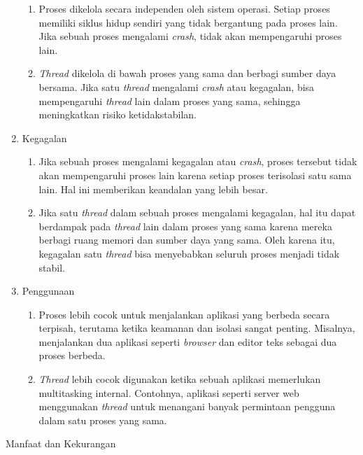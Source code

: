 \documentclass[12pt]{article}
\begin{document}
\begin{enumerate}
	            \begin{enumerate}
		            \item Proses dikelola secara independen oleh sistem operasi. Setiap proses memiliki siklus hidup sendiri yang tidak bergantung pada proses lain. Jika sebuah proses mengalami \textit{crash}, tidak akan mempengaruhi proses lain.
		            \item \textit{Thread} dikelola di bawah proses yang sama dan berbagi sumber daya bersama. Jika satu \textit{thread} mengalami \textit{crash} atau kegagalan, bisa mempengaruhi \textit{thread} lain dalam proses yang sama, sehingga meningkatkan risiko ketidakstabilan.
	            \end{enumerate}
	      \item Kegagalan
	            \begin{enumerate}
		            \item Jika sebuah proses mengalami kegagalan atau \textit{crash}, proses tersebut tidak akan mempengaruhi proses lain karena setiap proses terisolasi satu sama lain. Hal ini memberikan keandalan yang lebih besar.
		            \item Jika satu \textit{thread} dalam sebuah proses mengalami kegagalan, hal itu dapat berdampak pada \textit{thread} lain dalam proses yang sama karena mereka berbagi ruang memori dan sumber daya yang sama. Oleh karena itu, kegagalan satu \textit{thread} bisa menyebabkan seluruh proses menjadi tidak stabil.
	            \end{enumerate}
	      \item Penggunaan
	            \begin{enumerate}
		            \item Proses lebih cocok untuk menjalankan aplikasi yang berbeda secara terpisah, terutama ketika keamanan dan isolasi sangat penting. Misalnya, menjalankan dua aplikasi seperti \textit{browser} dan editor teks sebagai dua proses berbeda.
		            \item \textit{Thread} lebih cocok digunakan ketika sebuah aplikasi memerlukan multitasking internal. Contohnya, aplikasi seperti server web menggunakan \textit{thread} untuk menangani banyak permintaan pengguna dalam satu proses yang sama.
	            \end{enumerate}
      \end{enumerate}
\item Manfaat dan Kekurangan
\end{document}
